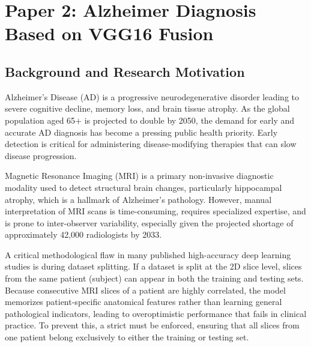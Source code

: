 
\section{Paper 2: Alzheimer Diagnosis Based on VGG16 Fusion}
\label{sec:alzheimer}


\subsection{Background and Research Motivation}
Alzheimer's Disease (AD) is a progressive neurodegenerative disorder leading to severe cognitive decline, memory loss, and brain tissue atrophy. As the global population aged 65+ is projected to double by 2050, the demand for early and accurate AD diagnosis has become a pressing public health priority. Early detection is critical for administering disease-modifying therapies that can slow disease progression.

Magnetic Resonance Imaging (MRI) is a primary non-invasive diagnostic modality used to detect structural brain changes, particularly hippocampal atrophy, which is a hallmark of Alzheimer's pathology. However, manual interpretation of MRI scans is time-consuming, requires specialized expertise, and is prone to inter-observer variability, especially given the projected shortage of approximately 42,000 radiologists by 2033.

A critical methodological flaw in many published high-accuracy deep learning studies is  during dataset splitting. If a dataset is split at the 2D slice level, slices from the same patient (subject) can appear in both the training and testing sets. Because consecutive MRI slices of a patient are highly correlated, the model memorizes patient-specific anatomical features rather than learning general pathological indicators, leading to overoptimistic performance that fails in clinical practice. To prevent this, a strict  must be enforced, ensuring that all slices from one patient belong exclusively to either the training or testing set.

